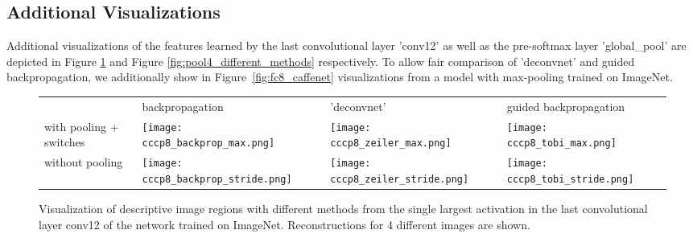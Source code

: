 \documentclass{article} \usepackage{iclr2015,times}
\begin{document}
\begin{appendix}
\section{Additional Visualizations}
Additional visualizations of the features learned by the last convolutional layer 'conv12' as well as the pre-softmax layer 'global\_pool' are depicted in Figure \ref{fig:cccp8_different_methods} and Figure \ref{fig:pool4_different_methods} respectively. To allow fair comparison of 'deconvnet' and guided backpropagation, we additionally show in Figure~\ref{fig:fc8_caffenet} visualizations from a model with max-pooling trained on ImageNet.

\begin{figure}[h]
\begin{center}
\begin{tabular}{ >{\centering\arraybackslash} m{1.5cm} >{\centering\arraybackslash} m{3.5cm} >{\centering\arraybackslash} m{3.5cm} >{\centering\arraybackslash} m{3.5cm} }
   & backpropagation & 'deconvnet' & guided backpropagation \\
  with pooling + switches & 
  \texttt{[image: cccp8\_backprop\_max.png]} &
  \texttt{[image: cccp8\_zeiler\_max.png]} &
  \texttt{[image: cccp8\_tobi\_max.png]} \\
  without pooling & 
  \texttt{[image: cccp8\_backprop\_stride.png]} &
  \texttt{[image: cccp8\_zeiler\_stride.png]} &
  \texttt{[image: cccp8\_tobi\_stride.png]} 
\end{tabular}
\end{center}
\caption{Visualization of descriptive image regions with different methods from the single largest activation in the last convolutional layer conv12 of the network trained on ImageNet. Reconstructions for 4 different images are shown.}
\label{fig:cccp8_different_methods}
\end{figure}


\end{appendix}
\end{document}
